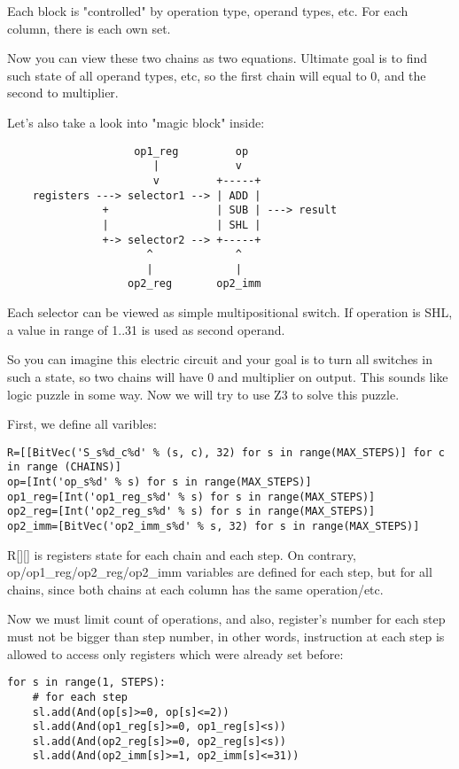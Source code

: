 Each block is "controlled" by operation type, operand types, etc.
For each column, there is each own set.

Now you can view these two chains as two equations.
Ultimate goal is to find such state of all operand types, etc, so the first chain will equal to 0,
and the second to multiplier.

Let's also take a look into "magic block" inside:

\begin{lstlisting}
	                op1_reg         op
	                   |            v
	                   v         +-----+
	registers ---> selector1 --> | ADD |
	           +                 | SUB | ---> result
	           |                 | SHL |
	           +-> selector2 --> +-----+
	                  ^             ^
	                  |             |
	               op2_reg       op2_imm
\end{lstlisting}

Each selector can be viewed as simple multipositional switch.
If operation is SHL, a value in range of 1..31 is used as second operand.

So you can imagine this electric circuit and your goal is to turn all switches in such a state, so two chains
will have 0 and multiplier on output.
This sounds like logic puzzle in some way.
Now we will try to use Z3 to solve this puzzle.

First, we define all varibles:

\begin{lstlisting}
R=[[BitVec('S_s%d_c%d' % (s, c), 32) for s in range(MAX_STEPS)] for c in range (CHAINS)]
op=[Int('op_s%d' % s) for s in range(MAX_STEPS)]
op1_reg=[Int('op1_reg_s%d' % s) for s in range(MAX_STEPS)]
op2_reg=[Int('op2_reg_s%d' % s) for s in range(MAX_STEPS)]
op2_imm=[BitVec('op2_imm_s%d' % s, 32) for s in range(MAX_STEPS)]
\end{lstlisting}

R[][] is registers state for each chain and each step.
On contrary, op/op1\_reg/op2\_reg/op2\_imm variables are defined for each step, but for all chains,
since both chains at each column has the same operation/etc.

Now we must limit count of operations, and also, register's number for each step must not be bigger than step number,
in other words, instruction at each step is allowed to access only registers which were already set before:

\begin{lstlisting}
for s in range(1, STEPS):
    # for each step
    sl.add(And(op[s]>=0, op[s]<=2))
    sl.add(And(op1_reg[s]>=0, op1_reg[s]<s))
    sl.add(And(op2_reg[s]>=0, op2_reg[s]<s))
    sl.add(And(op2_imm[s]>=1, op2_imm[s]<=31))
\end{lstlisting}

